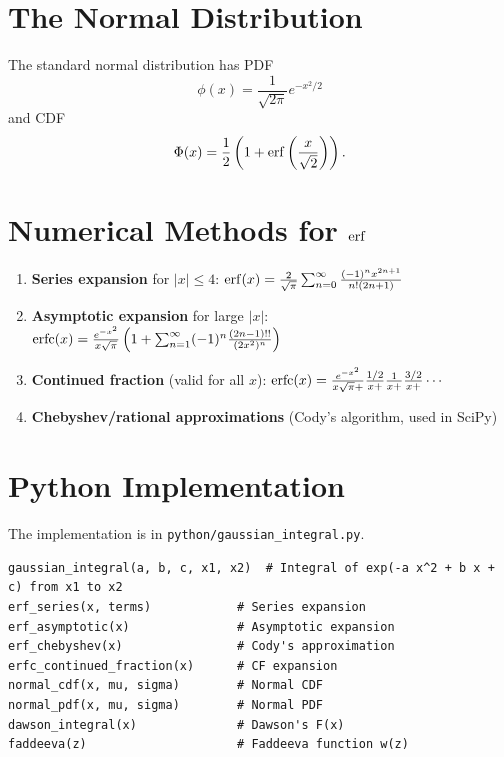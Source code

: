 \section{The Normal Distribution}

The standard normal distribution has PDF
\[
\phi(x) = \frac{1}{\sqrt{2\pi}} e^{-x^2/2}
\]
and CDF
\[
\Phi(x) = \frac{1}{2} \left(1 + \operatorname{erf}\left(\frac{x}{\sqrt{2}}\right)\right).
\]

\section{Numerical Methods for $\operatorname{erf}$}

\begin{enumerate}
    \item \textbf{Series expansion} for $|x| \le 4$:
    $\operatorname{erf}(x) = \frac{2}{\sqrt{\pi}} \sum_{n=0}^{\infty} \frac{(-1)^n x^{2n+1}}{n!(2n+1)}$
    
    \item \textbf{Asymptotic expansion} for large $|x|$:
    $\operatorname{erfc}(x) = \frac{e^{-x^2}}{x\sqrt{\pi}} \left(1 + \sum_{n=1}^{\infty} (-1)^n \frac{(2n-1)!!}{(2x^2)^n} \right)$
    
    \item \textbf{Continued fraction} (valid for all $x$):
    $\operatorname{erfc}(x) = \frac{e^{-x^2}}{x\sqrt{\pi} +} \frac{1/2}{x +} \frac{1}{x +} \frac{3/2}{x +} \cdots$
    
    \item \textbf{Chebyshev/rational approximations} (Cody's algorithm, used in SciPy)
\end{enumerate}

\section{Python Implementation}

The implementation is in \texttt{python/gaussian\_integral.py}.

\begin{lstlisting}[style=python, caption={Key functions in python/gaussian\_integral.py}]
gaussian_integral(a, b, c, x1, x2)  # Integral of exp(-a x^2 + b x + c) from x1 to x2
erf_series(x, terms)            # Series expansion
erf_asymptotic(x)               # Asymptotic expansion
erf_chebyshev(x)                # Cody's approximation
erfc_continued_fraction(x)      # CF expansion
normal_cdf(x, mu, sigma)        # Normal CDF
normal_pdf(x, mu, sigma)        # Normal PDF
dawson_integral(x)              # Dawson's F(x)
faddeeva(z)                     # Faddeeva function w(z)
\end{lstlisting}

